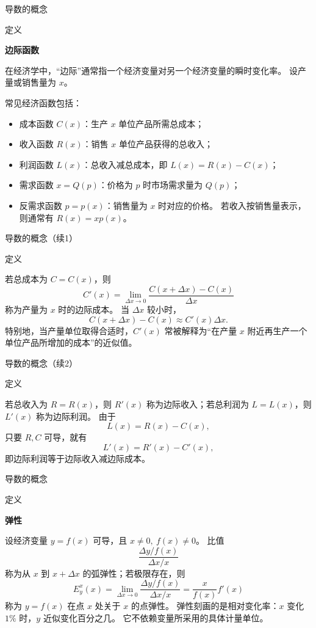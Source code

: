 \documentclass[aspectratio=169,10pt,fontset=fandol]{ctexbeamer}
\begin{document}
\begin{frame}[t,fragile]{导数的概念}
\footnotesize
\begin{block}{定义}
{\footnotesize
\textbf{边际函数}\par

在经济学中，“边际”通常指一个经济变量对另一个经济变量的瞬时变化率。 设产量或销售量为 $x$。

常见经济函数包括：
\begin{itemize}
\item 成本函数 $C(x)$：生产 $x$ 单位产品所需总成本；
\item 收入函数 $R(x)$：销售 $x$ 单位产品获得的总收入；
\item 利润函数 $L(x)$：总收入减总成本，即 $L(x)=R(x)-C(x)$；
\item 需求函数 $x=Q(p)$：价格为 $p$ 时市场需求量为 $Q(p)$；
\item 反需求函数 $p=p(x)$：销售量为 $x$ 时对应的价格。 若收入按销售量表示，则通常有 $R(x)=xp(x)$。
\end{itemize}
}
\end{block}
\end{frame}
\begin{frame}[t,fragile]{导数的概念（续1）}
\footnotesize
\begin{block}{定义}
{\footnotesize
若总成本为 $C=C(x)$，则
\[
C'(x)=\lim_{\Delta x\to0}\frac{C(x+\Delta x)-C(x)}{\Delta x}
\]
称为产量为 $x$ 时的边际成本。 当 $\Delta x$ 较小时，
\[
C(x+\Delta x)-C(x)\approx C'(x)\Delta x.
\]
特别地，当产量单位取得合适时，$C'(x)$ 常被解释为“在产量 $x$ 附近再生产一个单位产品所增加的成本”的近似值。


}
\end{block}
\end{frame}
\begin{frame}[t,fragile]{导数的概念（续2）}
\footnotesize
\begin{block}{定义}
{\footnotesize
若总收入为 $R=R(x)$，则 $R'(x)$ 称为边际收入；若总利润为 $L=L(x)$，则 $L'(x)$ 称为边际利润。 由于
\[
L(x)=R(x)-C(x),
\]
只要 $R,C$ 可导，就有
\[
L'(x)=R'(x)-C'(x),
\]
即边际利润等于边际收入减边际成本。

}
\end{block}
\end{frame}
\begin{frame}[t,fragile]{导数的概念}
\footnotesize
\begin{block}{定义}
{\footnotesize
\textbf{弹性}\par

设经济变量 $y=f(x)$ 可导，且 $x\neq0,\ f(x)\neq0$。 比值
\[
\frac{\Delta y/f(x)}{\Delta x/x}
\]
称为从 $x$ 到 $x+\Delta x$ 的弧弹性；若极限存在，则
\[
E_y^x(x)=\lim_{\Delta x\to0}\frac{\Delta y/f(x)}{\Delta x/x}
=\frac{x}{f(x)}f'(x)
\]
称为 $y=f(x)$ 在点 $x$ 处关于 $x$ 的点弹性。 弹性刻画的是相对变化率：$x$ 变化 $1\%$ 时，$y$ 近似变化百分之几。 它不依赖变量所采用的具体计量单位。

}
\end{block}
\end{frame}
\end{document}
